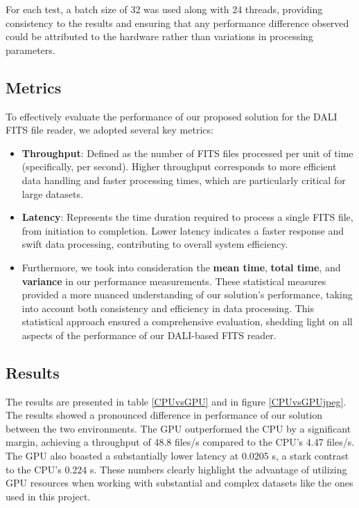 \documentclass[licencjacka,en]{pracamgr}
\begin{document}
For each test, a batch size of 32 was used along with 24 threads, providing consistency to the results and ensuring that any performance difference observed could be attributed to the hardware rather than variations in processing parameters.



\subsection{Metrics}


To effectively evaluate the performance of our proposed solution for the DALI FITS file reader, we adopted several key metrics:
\begin{itemize}
    \item \textbf{Throughput}: Defined as the number of FITS files processed per unit of time (specifically, per second). Higher throughput corresponds to more efficient data handling and faster processing times, which are particularly critical for large datasets.
    \item \textbf{Latency}: Represents the time duration required to process a single FITS file, from initiation to completion. Lower latency indicates a faster response and swift data processing, contributing to overall system efficiency.
    \item Furthermore, we took into consideration the \textbf{mean time}, \textbf{total time}, and \textbf{variance} in our performance measurements. These statistical measures provided a more nuanced understanding of our solution's performance, taking into account both consistency and efficiency in data processing. This statistical approach ensured a comprehensive evaluation, shedding light on all aspects of the performance of our DALI-based FITS reader.
\end{itemize}


\subsection{Results}
The results are presented in table \ref{CPUvsGPU} and in figure \ref{CPUvsGPUjpeg}.
The results showed a pronounced difference in performance of our solution between the two environments. The GPU outperformed the CPU by a significant margin, achieving a throughput of 48.8 files/s compared to the CPU's 4.47 files/s. The GPU also boasted a substantially lower latency at 0.0205 s, a stark contrast to the CPU's 0.224 s. These numbers clearly highlight the advantage of utilizing GPU resources when working with substantial and complex datasets like the ones used in this project.
\end{document}
